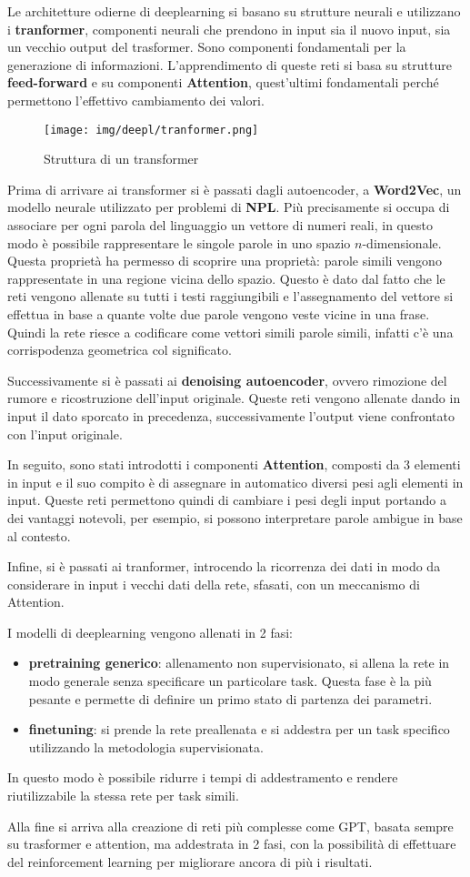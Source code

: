 Le architetture odierne di deeplearning si basano su strutture neurali e utilizzano i
\textbf{tranformer}, componenti neurali che prendono in input sia il nuovo input,
sia un vecchio output del trasformer. Sono componenti fondamentali per la generazione
di informazioni. L'apprendimento di queste reti si basa su strutture \textbf{feed-forward}
e su componenti \textbf{Attention}, quest'ultimi fondamentali perché permettono
l'effettivo cambiamento dei valori.
\begin{figure}[!ht]
    \centering
    \texttt{[image: img/deepl/tranformer.png]}
    \caption{Struttura di un transformer}
    \label{fig:attention}
\end{figure}
Prima di arrivare ai transformer si è passati dagli autoencoder, a \textbf{Word2Vec},
un modello neurale utilizzato per problemi di \textbf{NPL}. Più precisamente si occupa
di associare per ogni parola del linguaggio un vettore di numeri reali, in questo
modo è possibile rappresentare le singole parole in uno spazio $n$-dimensionale.
Questa proprietà ha permesso di scoprire una proprietà: parole simili vengono
rappresentate in una regione vicina dello spazio. Questo è dato dal fatto che
le reti vengono allenate su tutti i testi raggiungibili e l'assegnamento del vettore
si effettua in base a quante volte due parole vengono veste vicine in una frase.
Quindi la rete riesce a codificare come vettori simili parole simili, infatti c'è
una corrispodenza geometrica col significato.

Successivamente si è passati ai \textbf{denoising autoencoder}, ovvero rimozione
del rumore e ricostruzione dell'input originale. Queste reti vengono allenate dando
in input il dato sporcato in precedenza, successivamente l'output viene confrontato
con l'input originale.

In seguito, sono stati introdotti i componenti \textbf{Attention}, composti da 3
elementi in input e il suo compito è di assegnare in automatico diversi pesi
agli elementi in input. Queste reti permettono quindi di cambiare i pesi degli input
portando a dei vantaggi notevoli, per esempio, si possono interpretare parole ambigue
in base al contesto.

Infine, si è passati ai tranformer, introcendo la ricorrenza dei dati in modo da
considerare in input i vecchi dati della rete, sfasati, con un meccanismo di
Attention.

I modelli di deeplearning vengono allenati in 2 fasi:
\begin{itemize}
    \item \textbf{pretraining generico}: allenamento non supervisionato, si allena
          la rete in modo generale senza specificare un particolare task. Questa
          fase è la più pesante e permette di definire un primo stato di partenza
          dei parametri.
    \item \textbf{finetuning}: si prende la rete preallenata e si addestra per un
          task specifico utilizzando la metodologia supervisionata.
\end{itemize}
In questo modo è possibile ridurre i tempi di addestramento e rendere riutilizzabile
la stessa rete per task simili.

Alla fine si arriva alla creazione di reti più complesse come GPT, basata sempre
su trasformer e attention, ma addestrata in 2 fasi, con la possibilità di effettuare
del reinforcement learning per migliorare ancora di più i risultati.